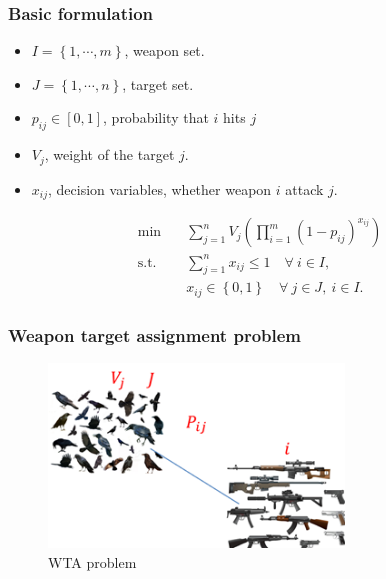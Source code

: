 \documentclass[CJK,10pt]{beamer}
\begin{document}
\begin{frame}
    \frametitle{Basic formulation}
     \begin{itemize}
    	\item $I = \left\{1,\cdots,m\right\} $, weapon set.
    	\item $J = \left\{1,\cdots,n\right\} $, target set.
    	\item $p_{ij}\in [0,1]$, probability that $i$ hits $j$
    	\item $V_j$, weight of the target $j$.
    	\item $x_{ij}$, decision variables, whether weapon $i$ attack $j$.
    \end{itemize}
    
    \begin{align*} \tag{S0'}
        \min\quad & \sum_{j=1}^n V_j \left( \prod_{i=1}^m (1 -  p_{ij})^{x_{ij}} \right) \\ 
        \mathrm{s. t.}\quad &\sum_{j=1}^n x_{ij} \leq 1\quad \forall ~i \in I,\\
        & x_{ij} \in \left\{ 0,1 \right\} \quad \forall~ j\in J , ~ i \in I.
    \end{align*}
\end{frame}

\begin{frame}
    \frametitle{Weapon target assignment problem}
    \begin{figure}[H]
        \centering
        \includegraphics[width=0.7\textwidth]{20221220150429.png}
        \caption{WTA problem} 
        \label{Fig.main2} 
        \end{figure}
\end{frame}
\end{document}
